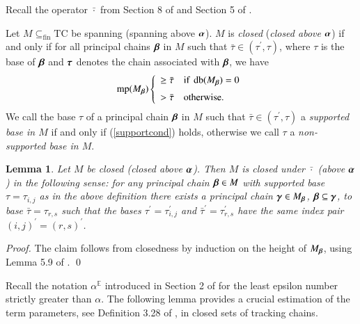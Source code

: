 \documentclass[3p,10pt,times]{elsarticle}
\newcommand{\al}{\alpha}
\newcommand{\alvec}{{\vec{\al}}}
\newcommand{\be}{\beta}
\newcommand{\bevec}{{\vec{\be}}}
\newcommand{\ga}{\gamma}
\newcommand{\gavec}{{\vec{\ga}}}
\newcommand{\tauvec}{{\vec{\tau}}}
\newcommand{\taupr}{{\tau^\prime}}
\newcommand{\taubar}{\bar{\tau}}
\newcommand{\taubarpr}{\bar{\tau}^\prime}
\newcommand{\Ez}{{\mathbb E}}
\newcommand{\finsub}{\subseteq_\mathrm{fin}}
\newcommand{\bardot}{\bar{\cdot}}
\newcommand{\sub}{\subseteq}
\newtheorem{lem}[theo]{Lemma}
\newcommand{\TC}{{\mathrm{TC}}}
\newcommand{\taucp}[1]{{\tau_{#1}}}
\newcommand{\taucppr}[1]{{\tau^\prime_{#1}}}
\newcommand{\maxparam}{\operatorname{mp}}
\newcommand{\db}{\operatorname{db}}
\def\vec#1{\mathchoice{\mbox{\boldmath$\displaystyle#1$}}
{\mbox{\boldmath$\textstyle#1$}}
{\mbox{\boldmath$\scriptstyle#1$}}
{\mbox{\boldmath$\scriptscriptstyle#1$}}}
\begin{document}
\noindent Recall the operator $\bardot$ from Section 8 of \cite{W07a} and Section 5 of \cite{CWa}. 
\begin{defi}[Closedness]\label{cldefi}\index{closed, closed above $\alvec$}
Let $M\finsub\TC$ be spanning (spanning above $\alvec$). $M$ is \emph{closed} (\emph{closed above $\alvec$}) if and only if
for all principal chains $\bevec$ in $M$ such that $\taubar\in(\taupr,\tau)$,
where $\tau$ is the base of $\bevec$ and $\tauvec$ denotes the chain associated with $\bevec$, 
we have 
\begin{equation}\label{supportcond}
   \maxparam(M_\bevec)\left\{\begin{array}{ll}
            \ge\taubar&\mbox{if } \db(M_\bevec)=0\\[2mm]
            >\taubar&\mbox{otherwise}.
            \end{array}\right.
\end{equation}
We call the base $\tau$ of a principal chain $\bevec$ in $M$ such that $\taubar\in(\taupr,\tau)$ a 
\emph{supported base in $M$}
if and only if (\ref{supportcond}) holds, otherwise we call $\tau$ a \emph{non-supported base in $M$}.
\end{defi}

\begin{lem}\label{closedbarlem}
Let $M$ be closed (closed above $\alvec$). Then $M$ is closed under $\bardot$ (above $\alvec$) in the following sense:
for any principal chain $\bevec\in M$ with supported base $\tau=\taucp{i,j}$ as in the above definition there exists 
a principal chain $\gavec\in M_\bevec$, $\bevec\sub\gavec$, to base $\taubar=\taucp{r,s}$ such that the bases $\taupr=\taucppr{i,j}$ and 
$\taubarpr=\taucppr{r,s}$ have the same index pair $(i,j)^\prime=(r,s)^\prime$.  
\end{lem}
\begin{proof}
The claim follows from closedness by induction on the height of $M_\bevec$, using Lemma 5.9 of \cite{CWa}.
\qed \end{proof}

Recall the notation $\al^\Ez$ introduced in Section 2 of \cite{W07a} for the least epsilon number strictly greater than $\al$.
The following lemma provides a crucial estimation of the term parameters, see Definition 3.28 of \cite{W07a}, 
in closed sets of tracking chains.
\end{document}
